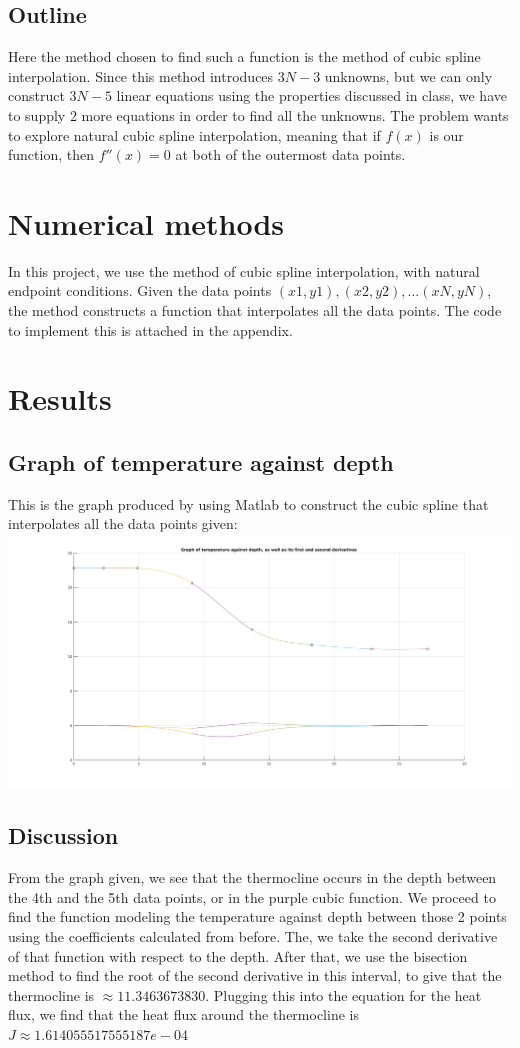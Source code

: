 \documentclass{article}
\begin{document}
	\subsection{Outline}
	Here the method chosen to find such a function is the method of cubic spline interpolation. Since this method introduces ${3N - 3}$ unknowns, but we can only construct ${3N - 5}$ linear equations using the properties discussed in class, we have to supply ${2}$ more equations in order to find all the unknowns. The problem wants to explore natural cubic spline interpolation, meaning that if ${f(x)}$ is our function, then ${f''(x) = 0}$ at both of the outermost data points.
	
	\section{Numerical methods}
	In this project, we use the method of cubic spline interpolation, with natural endpoint conditions. Given the data points ${(x1, y1), (x2, y2), ... (xN, yN)}$, the method constructs a function that interpolates all the data points. The code to implement this is attached in the appendix.
	
	\section{Results}
    
    \subsection{Graph of temperature against depth}
    This is the graph produced by using Matlab to construct the cubic spline that interpolates all the data points given:\\
    \includegraphics[scale=0.25]{Graph.png}
    \subsection{Discussion}
    From the graph given, we see that the thermocline occurs in the depth between the 4th and the 5th data points, or in the purple cubic function. We proceed to find the function modeling the temperature against depth between those 2 points using the coefficients calculated from before. The, we take the second derivative of that function with respect to the depth. After that, we use the bisection method to find the root of the second derivative in this interval, to give that the thermocline is ${\approx 11.3463673830}$. Plugging this into the equation for the heat flux, we find that the heat flux around the thermocline is ${J\approx1.614055517555187e-04}$
\end{document}
